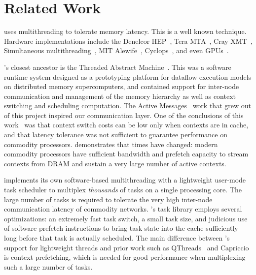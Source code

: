 \section{Related Work}

\vspace{0.5ex}
\Grappa uses multithreading to tolerate memory
latency. This is a well known technique. Hardware implementations include the
Denelcor HEP~\cite{hep}, Tera MTA~\cite{tera:mta1}, Cray XMT~\cite{feo:xmt}, Simultaneous
multithreading~\cite{tullsen:smt}, MIT Alewife~\cite{agarwal:alewife},
Cyclops~\cite{almasi:cyclops}, and even GPUs~\cite{gpus}.

\Grappa's closest ancestor is the Threaded Abstract
Machine~\cite{CullerGSvE93}. This was a software runtime system
designed as a prototyping platform for dataflow execution models on
distributed memory supercomputers, and contained support for
inter-node communication and management of the memory hierarchy as
well as context switching and scheduling computation. The Active
Messages~\cite{vonEicken:1992:AMM:139669.140382} work that grew out of
this project inspired our communication layer. One of the conclusions
of this work~\cite{Culler:1993:TFL:647025.714362} was that context
switch costs can be low only when contexts are in cache, and that
latency tolerance was not sufficient to guarantee performance on
commodity processors. \Grappa demonstrates that times have changed:
modern commodity processors have sufficient bandwidth and prefetch
capacity to stream contexts from DRAM and sustain a very large number of active contexts. 


\Grappa implements its own software-based multithreading with a
lightweight user-mode task scheduler to multiplex \emph{thousands\/} of tasks
on a single processing core. The large number of tasks is required to tolerate
the very high inter-node communication latency of commodity networks.
\Grappa's task library employs several optimizations: an extremely fast task
switch, a small task size, and judicious use of software prefetch instructions
to bring task state into the cache sufficiently long before that task is
actually scheduled. The main difference between \Grappa's support for
lightweight threads and prior work such as
QThreads~\cite{Wheeler08qthreads:an} and
Capriccio~\cite{Behren03capriccio:scalable} is context prefetching, which is needed for good performance when multiplexing such a large
number of tasks.

